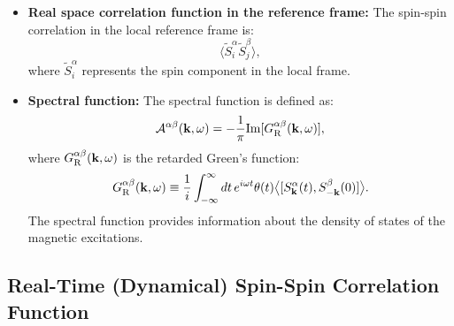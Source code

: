 \documentclass[aps, prx, nofootinbib, superscriptaddress]{revtex4-2}
\begin{document}
\begin{itemize}
    \item \textbf{Real space correlation function in the reference frame:}
    The spin-spin correlation in the local reference frame is:
    \begin{equation}
        \langle \widetilde{S}^{\alpha}_{i} \widetilde{S}_{j}^{\beta} \rangle,
    \end{equation}
    where $\widetilde{S}^{\alpha}_{i}$ represents the spin component in the local frame.
    
    \item \textbf{Spectral function:}
    The spectral function is defined as:
    \begin{equation}
        \mathcal{A}^{\alpha\beta}(\mathbf{k}, \omega) = -\frac{1}{\pi} \mathrm{Im}[G^{\alpha\beta}_{\rm R}(\mathbf{k}, \omega)],
    \end{equation}
    where $G^{\alpha\beta}_{\rm R}(\mathbf{k}, \omega)$ is the retarded Green's function:
    \begin{equation}
        G^{\alpha\beta}_{\rm R}(\mathbf{k}, \omega) 
        \equiv \frac{1}{i} \int_{-\infty}^{\infty} dt \, e^{i \omega t} \theta(t) \big\langle [S_{\mathbf{k}}^{\alpha}(t), S_{-\mathbf{k}}^{\beta}(0)] \big\rangle.
    \end{equation}
    The spectral function provides information about the density of states of the magnetic excitations.
\end{itemize}




\subsection{Real-Time (Dynamical) Spin-Spin Correlation Function}\label{subsec: Real-Time (Dynamical) Spin-Spin Correlation Function}
\end{document}
